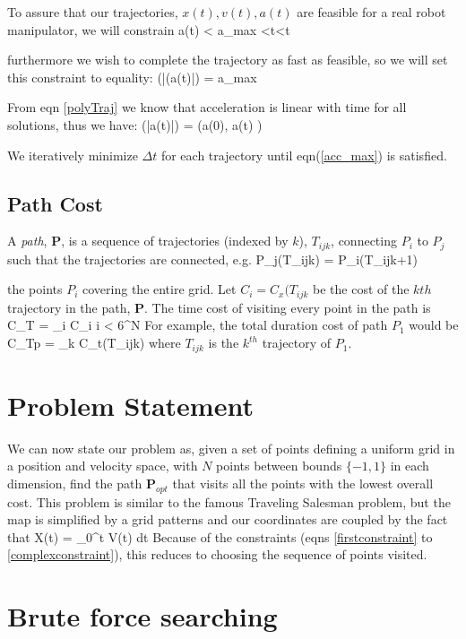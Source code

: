 \documentclass[letterpaper]{article}
\begin{document}
To assure that our trajectories, $x(t),v(t),a(t)$ are feasible
for a real robot manipulator, we will constrain
\beq
a(t) < a_{max} <t<\Delta t
\eeq

furthermore we wish to complete the trajectory as fast as
feasible, so we will set this constraint to equality:
\beq
\max(|(a(t)|) = a_{max}
\eeq

From eqn \ref{polyTraj} we know that acceleration is linear with
time for all solutions, thus we have:
\beq \label{acc_max}
\max(|a(t)|) = \max(a(0), a(\Delta t) )
\eeq

We iteratively minimize $\Delta t$ for each trajectory until
eqn(\ref{acc_max}) is satisfied.

\subsection{Path Cost}
A {\it path}, $\mathbf{P}$, is a sequence of
trajectories (indexed by $k$), $T_{ijk}$,
connecting $P_i$ to $P_j$
such that the trajectories are connected, e.g.
\beq
P_j(T_{ijk}) = P_i(T_{ijk+1})
\eeq

the points $P_i$ covering the entire grid.
Let $C_i=C_x(T_{ijk}$ be the cost of the $kth$ trajectory in
the path, $\mathbf{P}$.
The time   cost of visiting every point in the path is
\beq
C_T = \Sigma_i C_i   \leq i < 6^N
\eeq
For example, the total duration cost of path ${P}_1$ would be
\beq
C_{Tp} = \Sigma_k C_t(T_{ijk})
\eeq
where $T_{ijk}$ is the $k^{th}$ trajectory of ${P}_1$.

\section{Problem Statement}

We can now state our problem as, given a set of points defining a uniform grid in a position and velocity
space, with $N$ points between bounds $\{-1,1\}$ in each dimension, find the path $\mathbf{P}_{opt}$
that visits all the points with the lowest overall cost.   This problem is similar to the famous
Traveling Salesman problem, but the map is simplified by a grid patterns and our coordinates are coupled by
the fact that
\beq
X(t) = \int_0^t V(t) dt
\eeq
Because of the constraints (eqns \ref{firstconstraint} to \ref{complexconstraint}), this reduces to
choosing the sequence of points visited.


\section{Brute force searching}
\end{document}
